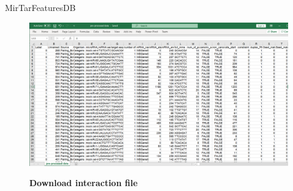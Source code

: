 \documentclass{beamer}
\begin{document}
\begin{frame}{MirTarFeaturesDB}



\begin{figure}[h!]
  \caption{\textbf{Download interaction file}}
      \includegraphics[width = 1\textwidth]{db figures/download.png}
      \label{fig:download}
          \end{figure}
\end{frame}
\end{document}

